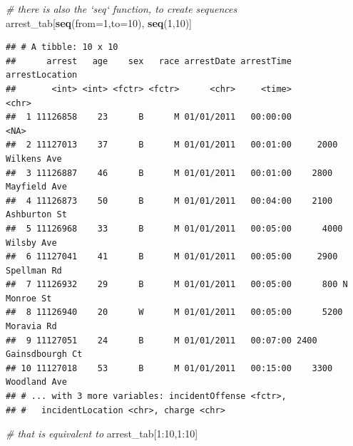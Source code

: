 \documentclass[]{article}
\newenvironment{Shaded}{\begin{snugshade}}{\end{snugshade}}
\newcommand{\KeywordTok}[1]{\textcolor[rgb]{0.13,0.29,0.53}{\textbf{{#1}}}}
\newcommand{\DataTypeTok}[1]{\textcolor[rgb]{0.13,0.29,0.53}{{#1}}}
\newcommand{\DecValTok}[1]{\textcolor[rgb]{0.00,0.00,0.81}{{#1}}}
\newcommand{\CommentTok}[1]{\textcolor[rgb]{0.56,0.35,0.01}{\textit{{#1}}}}
\newcommand{\NormalTok}[1]{{#1}}
\theoremstyle{definition}
\theoremstyle{definition}
\theoremstyle{remark}
\begin{document}
\begin{Shaded}
\begin{Highlighting}[]
\CommentTok{# there is also the `seq` function, to create sequences}
\NormalTok{arrest_tab[}\KeywordTok{seq}\NormalTok{(}\DataTypeTok{from=}\DecValTok{1}\NormalTok{,}\DataTypeTok{to=}\DecValTok{10}\NormalTok{), }\KeywordTok{seq}\NormalTok{(}\DecValTok{1}\NormalTok{,}\DecValTok{10}\NormalTok{)]}
\end{Highlighting}
\end{Shaded}

\begin{verbatim}
## # A tibble: 10 x 10
##      arrest   age    sex   race arrestDate arrestTime       arrestLocation
##       <int> <int> <fctr> <fctr>      <chr>     <time>                <chr>
##  1 11126858    23      B      M 01/01/2011   00:00:00                 <NA>
##  2 11127013    37      B      M 01/01/2011   00:01:00     2000 Wilkens Ave
##  3 11126887    46      B      M 01/01/2011   00:01:00    2800 Mayfield Ave
##  4 11126873    50      B      M 01/01/2011   00:04:00    2100 Ashburton St
##  5 11126968    33      B      M 01/01/2011   00:05:00      4000 Wilsby Ave
##  6 11127041    41      B      M 01/01/2011   00:05:00     2900 Spellman Rd
##  7 11126932    29      B      M 01/01/2011   00:05:00      800 N Monroe St
##  8 11126940    20      W      M 01/01/2011   00:05:00      5200 Moravia Rd
##  9 11127051    24      B      M 01/01/2011   00:07:00 2400 Gainsdbourgh Ct
## 10 11127018    53      B      M 01/01/2011   00:15:00    3300 Woodland Ave
## # ... with 3 more variables: incidentOffense <fctr>,
## #   incidentLocation <chr>, charge <chr>
\end{verbatim}

\begin{Shaded}
\begin{Highlighting}[]
\CommentTok{# that is equivalent to }
\NormalTok{arrest_tab[}\DecValTok{1}\NormalTok{:}\DecValTok{10}\NormalTok{,}\DecValTok{1}\NormalTok{:}\DecValTok{10}\NormalTok{]}
\end{Highlighting}
\end{Shaded}
\end{document}
